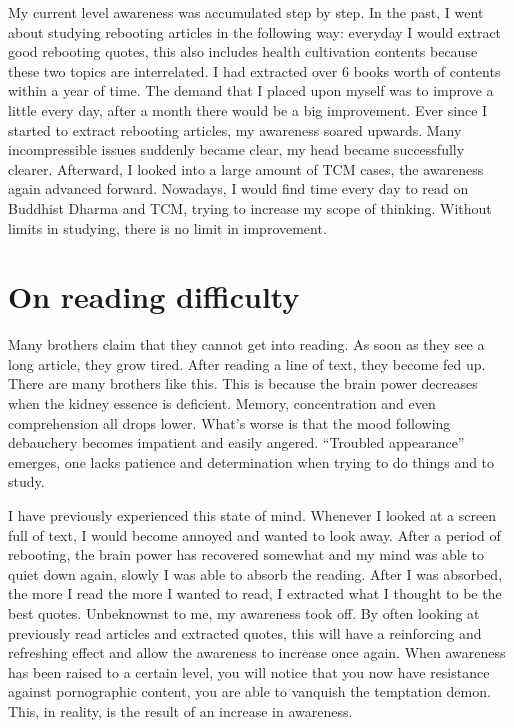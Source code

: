 \documentclass[
]{book}
\begin{document}
My current level awareness was accumulated step by step. In the past, I went about studying rebooting articles in the following way: everyday I would extract good rebooting quotes, this also includes health cultivation contents because these two topics are interrelated. I had extracted over 6 books worth of contents within a year of time. The demand that I placed upon myself was to improve a little every day, after a month there would be a big improvement. Ever since I started to extract rebooting articles, my awareness soared upwards. Many incompressible issues suddenly became clear, my head became successfully clearer. Afterward, I looked into a large amount of TCM cases, the awareness again advanced forward. Nowadays, I would find time every day to read on Buddhist Dharma and TCM, trying to increase my scope of thinking. Without limits in studying, there is no limit in improvement.

\hypertarget{on-reading-difficulty}{%
\section{On reading difficulty}\label{on-reading-difficulty}}

Many brothers claim that they cannot get into reading. As soon as they see a long article, they grow tired. After reading a line of text, they become fed up. There are many brothers like this. This is because the brain power decreases when the kidney essence is deficient. Memory, concentration and even comprehension all drops lower. What's worse is that the mood following debauchery becomes impatient and easily angered. ``Troubled appearance'' emerges, one lacks patience and determination when trying to do things and to study.

I have previously experienced this state of mind. Whenever I looked at a screen full of text, I would become annoyed and wanted to look away. After a period of rebooting, the brain power has recovered somewhat and my mind was able to quiet down again, slowly I was able to absorb the reading. After I was absorbed, the more I read the more I wanted to read, I extracted what I thought to be the best quotes. Unbeknownst to me, my awareness took off. By often looking at previously read articles and extracted quotes, this will have a reinforcing and refreshing effect and allow the awareness to increase once again. When awareness has been raised to a certain level, you will notice that you now have resistance against pornographic content, you are able to vanquish the temptation demon. This, in reality, is the result of an increase in awareness.
\end{document}
